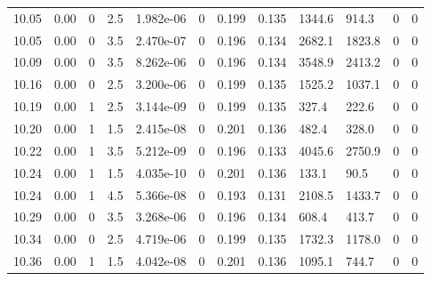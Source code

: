 \documentclass[preview]{standalone}
\begin{document}
{{{{{{{{{{\begin{tabular}{L{1.2cm}C{1.2cm} C{0.3cm}C{0.5cm} C{1.4cm}C{1.4cm} C{1.4cm}C{1.4cm} C{1.6cm}C{1.6cm} C{1.6cm}C{1.6cm}}
  10.05  &  0.00  & 0     & 2.5 &  1.982e-06  & 0  &  0.199&   0.135& 1344.6 & 914.3   &  0 & 0  \\ 
  10.05  &  0.00  & 0     & 3.5 &  2.470e-07  & 0  &  0.196&   0.134& 2682.1 & 1823.8   &  0 & 0  \\ 
  10.09  &  0.00  & 0     & 3.5 &  8.262e-06  & 0  &  0.196&   0.134& 3548.9 & 2413.2   &  0 & 0  \\ 
  10.16  &  0.00  & 0     & 2.5 &  3.200e-06  & 0  &  0.199&   0.135& 1525.2 & 1037.1   &  0 & 0  \\ 
  10.19  &  0.00  & 1     & 2.5 &  3.144e-09  & 0  &  0.199&   0.135& 327.4 & 222.6   &  0 & 0  \\ 
  10.20  &  0.00  & 1     & 1.5 &  2.415e-08  & 0  &  0.201&   0.136& 482.4 & 328.0   &  0 & 0  \\ 
  10.22  &  0.00  & 1     & 3.5 &  5.212e-09  & 0  &  0.196&   0.133& 4045.6 & 2750.9   &  0 & 0  \\ 
  10.24  &  0.00  & 1     & 1.5 &  4.035e-10  & 0  &  0.201&   0.136& 133.1 & 90.5   &  0 & 0  \\ 
  10.24  &  0.00  & 1     & 4.5 &  5.366e-08  & 0  &  0.193&   0.131& 2108.5 & 1433.7   &  0 & 0  \\ 
  10.29  &  0.00  & 0     & 3.5 &  3.268e-06  & 0  &  0.196&   0.134& 608.4 & 413.7   &  0 & 0  \\ 
  10.34  &  0.00  & 0     & 2.5 &  4.719e-06  & 0  &  0.199&   0.135& 1732.3 & 1178.0   &  0 & 0  \\ 
  10.36  &  0.00  & 1     & 1.5 &  4.042e-08  & 0  &  0.201&   0.136& 1095.1 & 744.7   &  0 & 0  \\ 
\hline 
\end{tabular} 

}}}}}}}}}}
\end{document}

